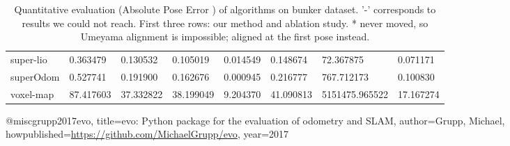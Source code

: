 \begin{table}[]
{\begin{tabular}{llllllll}
		super-lio & 0.363479 & 0.130532 & 0.105019 & 0.014549 & 0.148674 & 72.367875 & 0.071171 \\
		superOdom & 0.527741 & 0.191900 & 0.162676 & 0.000945 & 0.216777 & 767.712173 & 0.100830 \\
		voxel-map & 87.417603 & 37.332822 & 38.199049 & 9.204370 & 41.090813 & 5151475.965522 & 17.167274 \\
        	\end{tabular}%
        }
        	\caption{Quantitative evaluation (Absolute Pose Error \cite{grupp2017evo}) of algorithms on bunker dataset. '-' corresponds to results we could not reach. First three rows: our method and ablation study. * never moved, so Umeyama alignment is impossible; aligned at the first pose instead.}
        	\label{table3}
\end{table}

@misc{grupp2017evo,
  title={evo: Python package for the evaluation of odometry and SLAM},
  author={Grupp, Michael},
  howpublished={\url{https://github.com/MichaelGrupp/evo}},
  year={2017}
}
